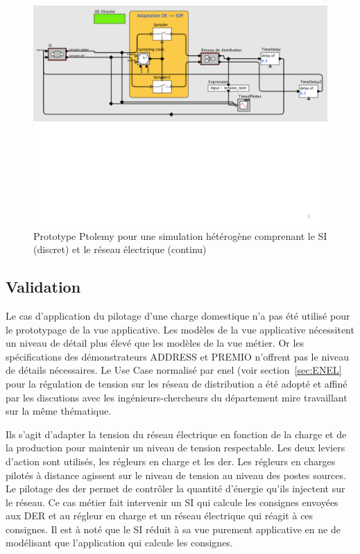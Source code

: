 \begin{figure}[!ht]
 \begin{center}
  \includegraphics[trim = 0cm 8cm 0cm 0cm, width=1\textwidth]{figures/6_methodologie/simu_ptolemy.pdf}
 \end{center}
 \caption{Prototype Ptolemy pour une simulation hétérogène comprenant le SI (discret) et le réseau électrique (continu)}
 \label{fig:simu_ptolemy}
\end{figure}
		
				\subsection{Validation}
		Le cas d'application du pilotage d'une charge domestique n'a pas été utilisé pour le prototypage de la vue applicative. Les modèles de la vue applicative nécessitent un niveau de détail plus élevé que les modèles de la vue métier. Or les spécifications des démonstrateurs ADDRESS et PREMIO n'offrent pas le niveau de détails nécessaires. Le Use Case normalisé par \gls{enel} (voir section~\ref{sec:ENEL} pour la régulation de tension sur les réseau de distribution a été adopté et affiné par les discutions avec les ingénieurs-chercheurs du département \gls{mire} travaillant sur la même thématique. 
		
		Ils s'agit d'adapter la tension du réseau électrique en fonction de la charge et de la production pour maintenir un niveau de tension respectable. Les deux leviers d'action sont utilisés, les régleurs en charge et les \gls{der}. Les régleurs en charges pilotés à distance agissent sur le niveau de tension au niveau des postes sources. Le pilotage des \gls{der} permet de contrôler la quantité d'énergie qu'ils injectent sur le réseau. Ce cas métier fait intervenir un SI qui calcule les consignes envoyées aux DER et au régleur en charge et un réseau électrique qui réagit à ces consignes. Il est à noté que le SI réduit à sa vue purement applicative en ne de modélisant que l'application qui calcule les consignes.
		
